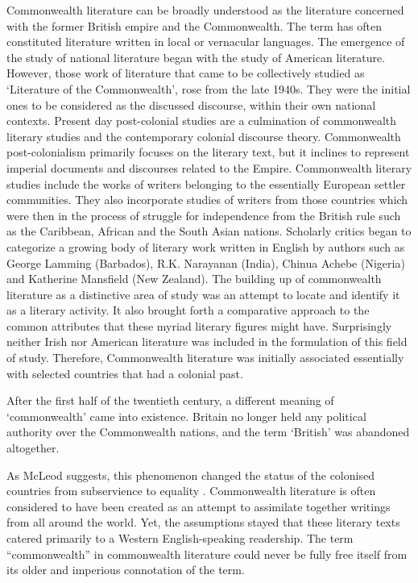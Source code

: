 Commonwealth literature can be broadly understood as the literature concerned with the former British empire and the Commonwealth. The term has often constituted literature written in local or vernacular languages. The emergence of the study of national literature began with the study of American literature. However, those work of literature that came to be collectively studied as ‘Literature of the Commonwealth’, rose from the late 1940s. They were the initial ones to be considered as the discussed discourse, within their own national contexts. Present day post-colonial studies are a culmination of commonwealth literary studies and the contemporary colonial discourse theory. Commonwealth post-colonialism primarily focuses on the literary text, but it inclines to represent imperial documents and discourses related to the Empire. Commonwealth literary studies include the works of writers belonging to the essentially European settler communities. They also incorporate studies of writers from those countries which were then in the process of struggle for independence from the British rule such as the Caribbean, African and the South Asian nations. Scholarly critics began to categorize a growing body of literary work written in English by authors such as George Lamming (Barbados), R.K. Narayanan (India), Chinua Achebe (Nigeria) and Katherine Mansfield (New Zealand). The building up of commonwealth literature as a distinctive area of study was an attempt to locate and identify it as a literary activity. It also brought forth a comparative approach to the common attributes that these myriad literary figures might have. Surprisingly neither Irish nor American literature was included in the formulation of this field of study. Therefore, Commonwealth literature was initially associated essentially with selected countries that had a colonial past. 

After the first half of the twentieth century, a different meaning of ‘commonwealth’ came into existence. Britain no longer held any political authority over the Commonwealth nations, and the term ‘British’ was abandoned altogether.

As McLeod suggests, this phenomenon changed the status of the \linebreak colonised countries from subservience to equality \parencite[12-15]{McLeod2007}. Commonwealth literature is often considered to have been created as an attempt to assimilate together writings from all around the world. Yet, the assumptions stayed that these literary texts catered primarily to a Western English-speaking readership. The term ``commonwealth'' in commonwealth literature could never be fully free itself from its older and imperious connotation of the term. 

